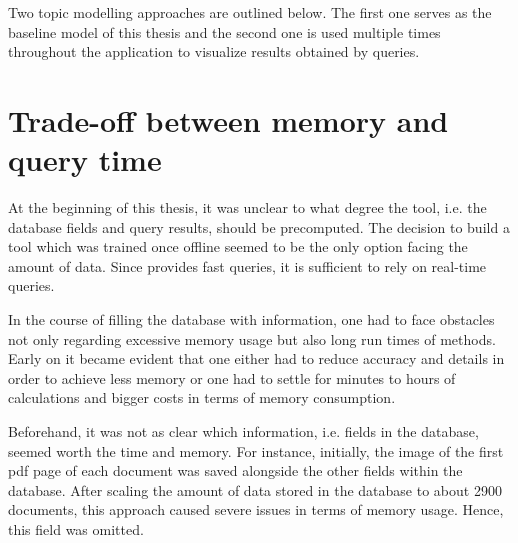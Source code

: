 Two topic modelling approaches are outlined below.
The first one serves as the baseline model of this thesis and 
the second one is used multiple times throughout the application to visualize results obtained by queries.










\section{Trade-off between memory and query time}\label{sec:trade-off}

At the beginning of this thesis, it was unclear to what degree the tool, 
i.e. the database fields and query results, should be precomputed.
The decision to build a tool which was trained once offline seemed to be the only option facing the amount of data.
Since \databaseName{} provides fast queries, it is sufficient to rely on real-time queries.

In the course of filling the database with information, 
one had to face obstacles not only regarding excessive memory usage but also long run times of methods.
Early on it became evident that one either had to reduce accuracy and details in order to achieve less memory or 
one had to settle for minutes to hours of calculations and bigger costs in terms of memory consumption.

Beforehand, it was not as clear which information, i.e. fields in the database, seemed worth the time and memory.
For instance, initially, the image of the first \ac{pdf} page of each document was saved alongside the other fields within the database.
After scaling the amount of data stored in the database to about 2900 documents, 
this approach caused severe issues in terms of memory usage.
Hence, this field was omitted.